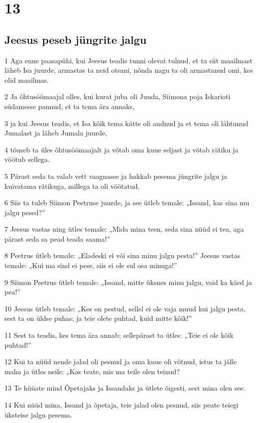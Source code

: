 \chapter{13}

\section*{Jeesus peseb jüngrite jalgu}

\par 1 Aga enne paasapühi, kui Jeesus teadis tunni olevat tulnud, et ta siit maailmast läheb Isa juurde, armastas ta neid otsani, nõnda nagu ta oli armastanud omi, kes olid maailmas.
\par 2 Ja õhtusöömaajal olles, kui kurat juba oli Juuda, Siimona poja Iskarioti südamesse pannud, et ta tema ära annaks,
\par 3 ja kui Jeesus teadis, et Isa kõik tema kätte oli andnud ja et tema oli lähtunud Jumalast ja läheb Jumala juurde,
\par 4 tõuseb ta üles õhtusöömaajalt ja võtab oma kuue seljast ja võtab rätiku ja vöötub sellega.
\par 5 Pärast seda ta valab vett vaagnasse ja hakkab pesema jüngrite jalgu ja kuivatama rätikuga, millega ta oli vöötatud.
\par 6 Siis ta tuleb Siimon Peetruse juurde, ja see ütleb temale: „Issand, kas sina mu jalgu pesed?”
\par 7 Jeesus vastas ning ütles temale: „Mida mina teen, seda sina nüüd ei tea, aga pärast seda sa pead teada saama!”
\par 8 Peetrus ütleb temale: „Eladeski ei või sina minu jalgu pesta!” Jeesus vastas temale: „Kui ma sind ei pese, siis ei ole sul osa minuga!”
\par 9 Siimon Peetrus ütleb temale: „Issand, mitte üksnes minu jalgu, vaid ka käed ja pea!”
\par 10 Jeesus ütleb temale: „Kes on pestud, sellel ei ole vaja muud kui jalgu pesta, sest ta on üldse puhas; ja teie olete puhtad, kuid mitte kõik!”
\par 11 Sest ta teadis, kes tema ära annab; sellepärast ta ütles: „Teie ei ole kõik puhtad!”
\par 12 Kui ta nüüd nende jalad oli pesnud ja oma kuue oli võtnud, istus ta jälle maha ja ütles neile: „Kas teate, mis ma teile olen teinud?
\par 13 Te hüüate mind Õpetajaks ja Issandaks ja ütlete õigesti, sest mina olen see.
\par 14 Kui nüüd mina, Issand ja õpetaja, teie jalad olen pesnud, siis peate teiegi üksteise jalgu pesema.

